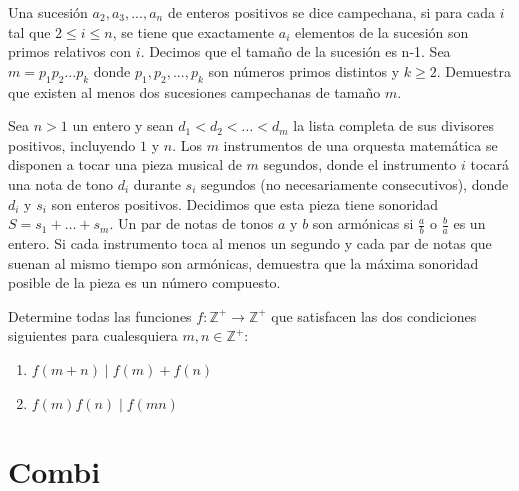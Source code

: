 \documentclass[11pt]{scrartcl}
\begin{document}
\begin{problem}
[2018/3]Una sucesión $a_2, a_3, ..., a_n$ de enteros positivos se dice campechana, si para cada $i$ tal que $2 \leq i \leq n$, se tiene que exactamente $a_i$ elementos de la sucesión son primos relativos con $i$. Decimos que el tamaño de la sucesión es n-1. Sea $m=p_1p_2...p_k$ donde $p_1, p_2, ..., p_k$ son números primos distintos y $k \geq 2$. Demuestra que existen al menos dos sucesiones campechanas de tamaño $m$.
\end{problem}
\begin{problem}
    [2022/3] 
    Sea $n>1$ un entero y sean $d_1< d_2< \dots< d_m$ la lista completa de sus divisores positivos, incluyendo $1$ y $n$. Los $m$ instrumentos de una orquesta matemática se disponen a tocar una pieza musical de $m$ segundos, donde el instrumento $i$ tocará una nota de tono $d_i$ durante $s_i$ segundos (no necesariamente consecutivos), donde $d_i$ y $s_i$ son enteros positivos. Decidimos que esta pieza tiene sonoridad $S=s_1+\dots+s_m$. Un par de notas de tonos $a$ y $b$ son armónicas si $\frac ab$ o $\frac ba$ es un entero. Si cada instrumento toca al menos un segundo y cada par de notas que suenan al mismo tiempo son armónicas, demuestra que la máxima sonoridad posible de la pieza es un número compuesto.
    
\end{problem}
\begin{problem} [2023/6]
    Determine todas las funciones $f: \mathbb{Z}^+ \rightarrow \mathbb {Z}^+$ que satisfacen las dos condiciones siguientes para cualesquiera $m,n \in \mathbb{Z}^+$:
    \begin{enumerate}
        \item $f(m+n) \mid f(m)+f(n)$
        \item $f(m)f(n) \mid f(mn)$
    \end{enumerate}
\end{problem}
\section{Combi}
\end{document}

